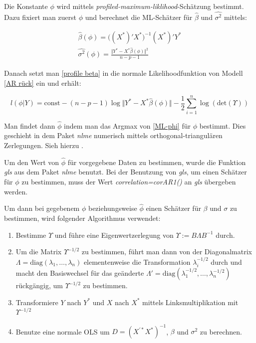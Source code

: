 \documentclass[12pt,a4paper]{article}
\theoremstyle{definition}
\theoremstyle{definition}
\theoremstyle{definition}
\theoremstyle{definition}
\begin{document}
Die Konstante $\phi$ wird mittels \textit{profiled-maximum-liklihood}-Schätzung bestimmt. Dazu fixiert man zuerst $\phi$ und berechnet die ML-Schätzer für $\hat{\beta}$ und $\widehat{\sigma^2}$ mittels:

\begin{eqnarray}
\label{profile beta}
\hat{\beta}(\phi) =  \big( (X^*)' X^* \big)^{-1} (X^*)' Y^* \\
\widehat{\sigma^2}(\phi) = \frac{\Vert Y^* - X^* \hat{\beta}(\phi) \Vert^2}{n-p-1} \nonumber
\end{eqnarray}

Danach setzt man \eqref{profile beta} in die normale Likelihoodfunktion von Modell \eqref{AR rück} ein und erhält:

\begin{equation}\label{ML-phi}
l(\phi|Y) = \text{const} - (n-p-1) \log \Vert Y^* - X^* \hat{\beta}(\phi) \Vert - \frac{1}{2} \sum^n_{i=1} \log( \text{det} (\Upsilon) )
\end{equation}

Man findet dann $\hat{\phi}$ indem man das Argmax von \eqref{ML-phi} für $\phi$ bestimmt. Dies geschieht in dem Paket \textit{nlme} numerisch mittels orthogonal-triangulären Zerlegungen. Sieh hierzu \cite[68-75]{Pinheiro00}.

Um den Wert von $\hat{\phi}$ für vorgegebene Daten zu bestimmen, wurde die Funktion \textit{gls} aus dem Paket \textit{nlme} benutzt. Bei der Benutzung von \textit{gls}, um einen Schätzer für $\phi$ zu bestimmen, muss der Wert \textit{correlation=corAR1()} an \textit{gls} übergeben werden.

Um dann bei gegebenem $\phi$ beziehungsweise $\hat{\phi}$ einen Schätzer für $\beta$ und $\sigma$ zu bestimmen, wird folgender Algorithmus verwendet:

\begin{enumerate}
\item Bestimme $\Upsilon$ und führe eine Eigenwertzerlegung von $\Upsilon := B \Lambda B^{-1}$ durch.
\item Um die Matrix $\Upsilon^{-1/2}$ zu bestimmen, führt man dann von der Diagonalmatrix $\Lambda = \text{diag}(\lambda_1, \ldots, \lambda_n)$ elementenweise die Transformation $\lambda_i^{-1/2}$ durch und macht den Basiswechsel für das geänderte $\Lambda' = \text{diag}(\lambda_1^{-1/2}, \ldots, \lambda_n^{-1/2})$ rückgängig, um $\Upsilon^{-1/2}$ zu bestimmen.
\item Transformiere $Y$ nach $Y^{*}$ und $X$ nach $X^{*}$ mittels Linksmultiplikation mit $\Upsilon^{-1/2}$
\item Benutze eine normale OLS um $D=(X^{'*}X^{*})^{-1}$, $\beta$ und $\sigma^2$ zu berechnen.
\end{enumerate}
\end{document}
